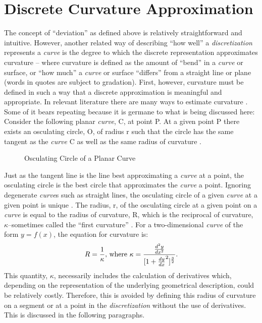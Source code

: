 \section{Discrete Curvature Approximation}
The concept of ``deviation'' as defined above is relatively straightforward and intuitive. However, another related way of describing ``how well'' a \textit{discretization} represents a \textit{curve} is the degree to which the discrete representation approximates curvature -- where curvature is defined as the amount of ``bend'' in a \textit{curve} or surface, or ``how much'' a \textit{curve} or surface ``differs'' from a straight line or plane (words in quotes are subject to gradation). First, however, curvature must be defined in such a way that a discrete approximation is meaningful and appropriate. In relevant literature there are many ways to estimate curvature \cite{hermann07}. Some of it bears repeating because it is germane to what is being discussed here: Consider the following planar \textit{curve}, C, at point P. At a given point P there exists an osculating circle, O, of radius r such that the circle has the same tangent as the \textit{curve} C as well as the same radius of curvature \cite{gray97}. \\

\begin{figure}[h!]
  \caption{\label{fig:OsculatingCircle} Osculating Circle of a Planar Curve}
\end{figure}

\noindent Just as the tangent line is the line best approximating a \textit{curve} at a point, the osculating circle is the best circle that approximates the \textit{curve} a point. Ignoring degenerate \textit{curve}s such as straight lines, the osculating circle of a given \textit{curve} at a given point is unique \cite{gray97}. The radius, r, of the osculating circle at a given point on a \textit{curve} is equal to the radius of curvature, R, which is the reciprocal of curvature, $\kappa$--sometimes called the ``first curvature'' \cite{kreyszig91}. For a two-dimensional \textit{curve} of the form $y=f(x)$, the equation for curvature is:
\[ 
R=\frac{1}{\kappa} \textnormal{, where } 
\kappa=\frac{\frac{d^2y}{dx^2}}{[1+\frac{dy}{dx}^2 ]^\frac{3}{2}}. 
\]
\noindent This quantity, $\kappa$, necessarily includes the calculation of 
derivatives which, depending on the representation of the underlying geometrical description, could be relatively costly. Therefore, this is avoided by defining this radius of curvature on a segment or at a point in the \textit{discretization} without the use of derivatives. This is discussed in the following paragraphs.

